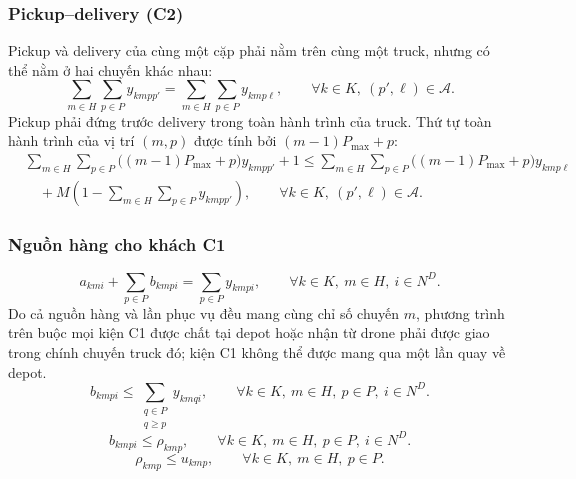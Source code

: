 \documentclass[12pt,a4paper]{article}
\begin{document}
\subsubsection{Pickup--delivery (C2)}

Pickup và delivery của cùng một cặp phải nằm trên cùng một truck, nhưng có thể nằm
ở hai chuyến khác nhau:
\begin{equation}
  \sum_{m\in H}\sum_{p\in P}y_{kmp p'} = \sum_{m\in H}\sum_{p\in P}y_{kmp \ell},
  \qquad \forall k\in K,\ (p',\ell)\in\mathcal A.
\end{equation}
Pickup phải đứng trước delivery trong toàn hành trình của truck. Thứ tự toàn hành
trình của vị trí $(m,p)$ được tính bởi $(m-1)P_{\max}+p$:
\begin{equation}
\begin{aligned}
  &\sum_{m\in H}\sum_{p\in P}\big((m-1)P_{\max}+p\big)y_{kmp p'}+1
  \le
  \sum_{m\in H}\sum_{p\in P}\big((m-1)P_{\max}+p\big)y_{kmp\ell}\\
  &\quad +M\left(1-\sum_{m\in H}\sum_{p\in P}y_{kmp p'}\right),
  \qquad \forall k\in K,\ (p',\ell)\in\mathcal A.
\end{aligned}
\end{equation}

\subsubsection{Nguồn hàng cho khách C1}

\begin{equation}
  a_{kmi}+\sum_{p\in P}b_{kmpi} = \sum_{p\in P}y_{kmpi}, \qquad \forall k\in K,\ m\in H,\ i\in N^D.
\end{equation}
Do cả nguồn hàng và lần phục vụ đều mang cùng chỉ số chuyến $m$, phương trình trên
buộc mọi kiện C1 được chất tại depot hoặc nhận từ drone phải được giao trong chính
chuyến truck đó; kiện C1 không thể được mang qua một lần quay về depot.
\begin{equation}
  b_{kmpi}\le \sum_{\substack{q\in P\\q\ge p}} y_{kmqi}, \qquad \forall k\in K,\ m\in H,\ p\in P,\ i\in N^D.
\end{equation}
\begin{equation}
  b_{kmpi}\le \rho_{kmp}, \qquad \forall k\in K,\ m\in H,\ p\in P,\ i\in N^D.
\end{equation}
\begin{equation}
  \rho_{kmp}\le u_{kmp}, \qquad \forall k\in K,\ m\in H,\ p\in P.
\end{equation}
\end{document}
